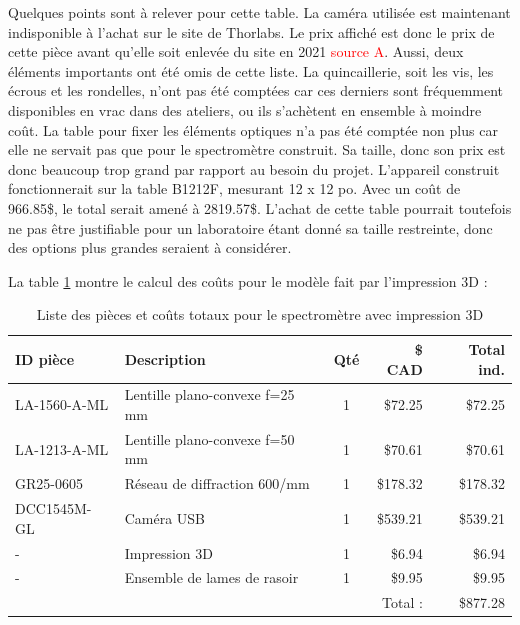 \documentclass[11pt,letterpaper]{article}
\begin{document}
Quelques points sont à relever pour cette table. La caméra utilisée est maintenant indisponible
à l'achat sur le site de Thorlabs. Le prix affiché est donc le prix de cette pièce avant
qu'elle soit enlevée du site en 2021 \textcolor{red}{source A}. Aussi, deux éléments importants
ont été omis de cette liste. La quincaillerie, soit les vis, les écrous et les 
rondelles, n'ont pas été comptées car ces derniers sont fréquemment disponibles en vrac dans
des ateliers, ou ils s'achètent en ensemble à moindre coût. La table pour fixer les éléments 
optiques n'a pas été comptée non plus car elle ne servait pas que pour le spectromètre 
construit. Sa taille, donc son prix est donc beaucoup trop grand par rapport au besoin du projet. L'appareil
construit fonctionnerait sur la table B1212F, mesurant 12 x 12 po. Avec un coût de 966.85\$,
le total serait amené à 2819.57\$. L'achat de cette table pourrait toutefois ne pas être 
justifiable pour un laboratoire étant donné sa taille restreinte, donc des options plus grandes
seraient à considérer.


La table \ref{prix_3D} montre le calcul des coûts pour le modèle fait par l'impression 3D :

\begin{table}[!ht]
    \centering
    \caption{Liste des pièces et coûts totaux pour le spectromètre avec impression 3D}
    \begin{tabular}{|l|l|c|r|r|}
    \hline
        ID pièce & Description & Qté & \$ CAD & Total ind. \\ \hline\hline
        LA-1560-A-ML & Lentille plano-convexe f=25 mm & 1 & \$72.25 & \$72.25 \\ \hline
        LA-1213-A-ML & Lentille plano-convexe f=50 mm & 1 & \$70.61 & \$70.61 \\ \hline
        GR25-0605 & Réseau de diffraction 600/mm & 1 & \$178.32 & \$178.32 \\ \hline
        DCC1545M-GL & Caméra USB & 1 & \$539.21 & \$539.21 \\ \hline
        - & Impression 3D & 1 & \$6.94 & \$6.94 \\ \hline
        - & Ensemble de lames de rasoir & 1 & \$9.95 & \$9.95 \\ \hline\hline
        ~ & ~ & ~ & Total : & \$877.28 \\ \hline
    \end{tabular}
    \label{prix_3D}
\end{table}
\end{document}
